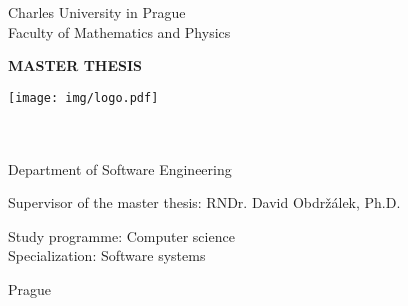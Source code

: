 \begin{titlingpage}
\begin{center}

\vspace{15mm}

\large
Charles University in Prague\\
Faculty of Mathematics and Physics\\

\vspace{10mm}

{\Large\textbf{MASTER THESIS}}

\vspace{20mm}

\texttt{[image: img/logo.pdf]} 

\vspace{20mm}

{\Large\theauthor}\\
\vspace{5mm}
{\Large\textbf{\thetitle}}\\
\vspace{5mm}
Department of Software Engineering\\
\vspace{20mm}

\large
\noindent Supervisor of the master thesis: RNDr. David Obdržálek, Ph.D.
\vspace{1mm}

\noindent Study programme: Computer science \\
Specialization: Software systems

\vspace{20mm}

Prague \the\year
\end{center}

\end{titlingpage}

\cleartorecto

